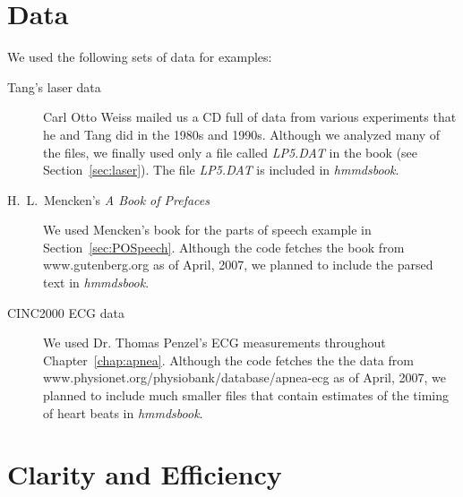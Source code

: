 \section{Data}
\label{sec:SWdata}

We used the following sets of data for examples:
\begin{description}
\item[Tang's laser data] Carl Otto Weiss  mailed
  us a CD full of data from various experiments that he and Tang did
  in the 1980s and 1990s.  Although we analyzed many of the files, we
  finally used only a file called \emph{LP5.DAT} in the book (see
  Section~\ref{sec:laser}).  The file \emph{LP5.DAT} is included in
  \emph{hmmdsbook}.
\item[H.~L.~Mencken's \emph{A Book of Prefaces}] We used Mencken's
  book for the parts of speech example in Section~\ref{sec:POSpeech}.
  Although the code fetches the book from www.gutenberg.org as of
  April, 2007, we planned to include the parsed text in
  \emph{hmmdsbook}.
\item[CINC2000 ECG data] We used Dr. Thomas Penzel's ECG measurements
  throughout Chapter~\ref{chap:apnea}.  Although the code fetches the
  the data from\\
  www.physionet.org/physiobank/database/apnea-ecg as of April, 2007,
  we planned to include much smaller files that contain estimates of
  the timing of heart beats in \emph{hmmdsbook}.
\end{description}

\section{Clarity and Efficiency}
\label{sec:Clarity}


